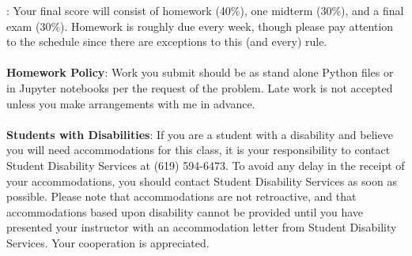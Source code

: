 \documentclass[a4paper,11pt]{article}
\begin{document}
: Your final score will consist of homework (40\%), one midterm (30\%), and a final exam (30\%).  Homework is roughly due every  week, though please pay attention to the schedule since there are exceptions to this (and every) rule.  \\
\\
{\bf Homework Policy}:  Work you submit should be as stand alone Python files or in Jupyter notebooks per the request of the problem.  Late work is not accepted unless you make arrangements with me in advance.\\  
\\
{\bf Students with Disabilities}: If you are a student with a disability and believe you will need accommodations for this class, it is your responsibility to contact Student Disability Services at (619) 594-6473. To avoid any delay in the receipt of your accommodations, you should contact Student Disability Services as soon as possible. Please note that accommodations are not retroactive, and that accommodations based upon disability cannot be provided until you have presented your instructor with an accommodation letter from Student Disability Services. Your cooperation is appreciated.\\
\end{document}
